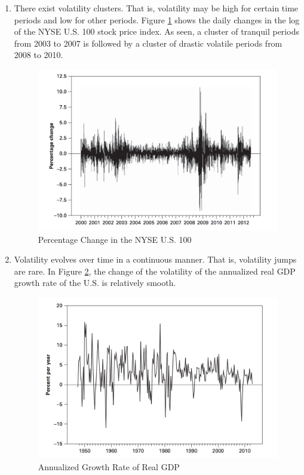 \documentclass[a4paper,11pt]{article}
\begin{document}
\begin{enumerate}
\item There exist volatility clusters. That is, volatility may be high
for certain time periods and low for other periods. Figure
\ref{fig:org9ac2999} shows the daily changes in the log of the NYSE
U.S. 100 stock price index. As seen, a cluster of tranquil periods
from 2003 to 2007 is followed by a cluster of drastic volatile
periods from 2008 to 2010. 

\begin{figure}[htbp]
\centering
\includegraphics[width=\textwidth]{img/nyse_us100.png}
\caption{\label{fig:org9ac2999}
Percentage Change in the NYSE U.S. 100}
\end{figure}

\item Volatility evolves over time in a continuous manner. That is,
volatility jumps are rare. In Figure \ref{fig:org9ed4c08}, the change of the
volatility of the annualized real GDP growth rate of the U.S. is
relatively smooth. 

\begin{figure}[htbp]
\centering
\includegraphics[width=\textwidth]{img/readgdp.png}
\caption{\label{fig:org9ed4c08}
Annualized Growth Rate of Real GDP}
\end{figure}


\end{enumerate}
\end{document}
